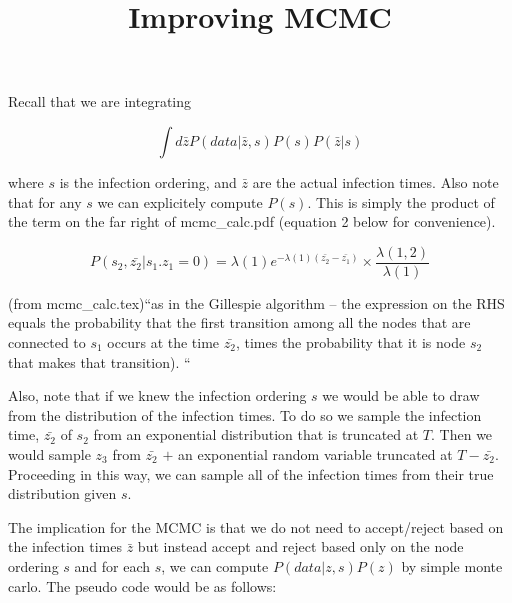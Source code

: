 \documentclass{article}
\begin{document}
\title{Improving MCMC}

Recall that we are integrating 

\begin{equation}
\int d\bar{z} P(data | \bar{z},s)P(s)P(\bar{z} |s)
\end{equation}

where $s$ is the infection ordering, and $\bar{z}$ are the actual infection times.  Also note that for any $s$ we can explicitely compute $P(s)$.  This is simply the product of the term on the far right of mcmc\_calc.pdf (equation 2 below for convenience).  

\begin{equation}
P(s_2, \bar{z_2} | s_1. z_1 =0)  =
\lambda(1) e^{- \lambda(1) (\bar{z_2} - \bar{z_1})} 
\times \frac{\lambda(1,2)}{\lambda(1)}
\end{equation}

        (from mcmc\_calc.tex)``as in the Gillespie algorithm -- the
	expression on the RHS equals the probability that the first transition
	among all the nodes that are connected to $s_1$ occurs at the time
	$\bar{z_2}$, times the probability that it is node $s_2$ that makes that
	transition). ``

Also, note that if we knew the infection ordering $s$ we would be able to draw from the distribution of the infection times.  To do so we sample the infection time, $\bar{z_2}$ of $s_2$ from an exponential distribution that is truncated at $T$.  Then we would sample $z_3$ from  $\bar{z_2}$ $+$ an exponential random variable truncated at $T-\bar{z_2}$.  Proceeding in this way, we can sample  all of the infection times from their true distribution given $s$.  

The implication for the MCMC is that we do not need to accept/reject based on the infection times $\bar{z}$ but instead accept and reject based only on the node ordering $s$ and for each $s$, we can compute $P(data | z, s)P(z)$ by simple monte carlo.  The pseudo code would be as follows:
\end{document}
